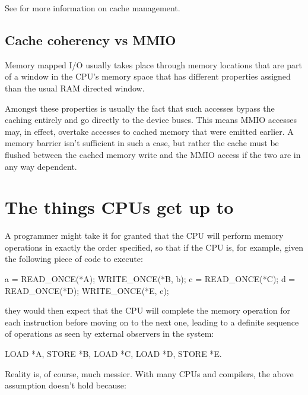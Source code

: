 See  for more information
on cache management.


\subsection{Cache coherency vs MMIO}

Memory mapped I/O usually takes place through memory locations that are part of
a window in the CPU's memory space that has different properties assigned than
the usual RAM directed window.

Amongst these properties is usually the fact that such accesses bypass the
caching entirely and go directly to the device buses.
This means MMIO accesses may, in effect, overtake accesses to cached memory
that were emitted earlier.
A memory barrier isn't sufficient in such a case, but rather the cache must be
flushed between the cached memory write and the MMIO access if the two are in
any way dependent.


\section{The things CPUs get up to}

A programmer might take it for granted that the CPU will perform memory
operations in exactly the order specified, so that if the CPU is, for example,
given the following piece of code to execute:

\begin{VerbatimU}
	a = READ_ONCE(*A);
	WRITE_ONCE(*B, b);
	c = READ_ONCE(*C);
	d = READ_ONCE(*D);
	WRITE_ONCE(*E, e);
\end{VerbatimU}

\noindent%
they would then expect that the CPU will complete the memory operation for each
instruction before moving on to the next one, leading to a definite sequence of
operations as seen by external observers in the system:

\begin{VerbatimU}
	LOAD *A, STORE *B, LOAD *C, LOAD *D, STORE *E.
\end{VerbatimU}

Reality is, of course, much messier.
With many CPUs and compilers, the above assumption doesn't hold because:

